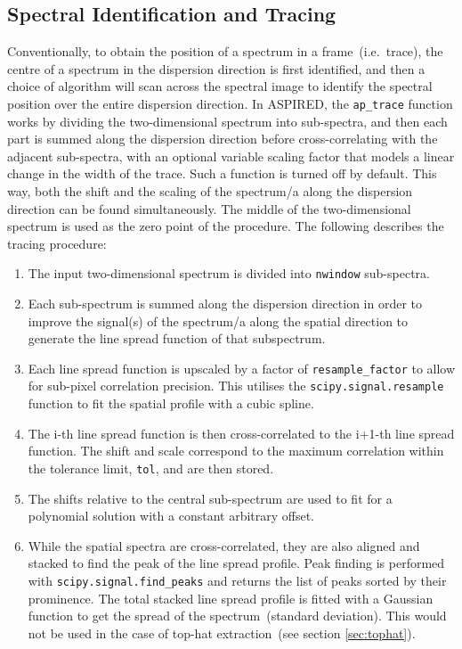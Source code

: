 \documentclass[linenumbers, twocolumn]{aastex631}
\begin{document}
\subsection{Spectral Identification and Tracing}
\label{sec:tracing}
Conventionally, to obtain the position of a spectrum in a frame~(i.e.\ trace),
the centre of a spectrum in the dispersion direction is first identified,
and then a choice of algorithm will scan across the spectral image to identify
the spectral position over the entire dispersion direction. In \textsc{ASPIRED},
the \texttt{ap\_trace} function works by dividing the two-dimensional spectrum
into sub-spectra, and then each part is summed along the dispersion direction
before cross-correlating with the adjacent sub-spectra, with an optional variable
scaling factor that models a linear change in the width of the trace. Such a
function is turned off by default. This way, both the shift and the scaling of
the spectrum/a along the dispersion direction can be found simultaneously. The
middle of the two-dimensional spectrum is used as the zero point of the
procedure. The following describes the tracing procedure:
\begin{enumerate}
    \item
        The input two-dimensional spectrum is divided into \texttt{nwindow}
        sub-spectra.
    \item
        Each sub-spectrum is summed along the dispersion direction
        in order to improve the signal(s) of the spectrum/a along
        the spatial direction to generate the line spread function
        of that subspectrum.
    \item
        Each line spread function is upscaled by a factor of
        \texttt{resample\_factor} to allow for sub-pixel correlation
        precision. This utilises the \texttt{scipy.signal.resample}
        function to fit the spatial profile with a cubic spline.
    \item
        The i-th line spread function is then cross-correlated to the i+1-th
        line spread function. The shift and scale correspond to the maximum
        correlation within the tolerance limit, \texttt{tol}, and are then stored.
    \item
        The shifts relative to the central sub-spectrum are used to
        fit for a polynomial solution with a constant arbitrary offset.
    \item
        While the spatial spectra are cross-correlated, they are also
        aligned and stacked to find the peak of the line spread profile.
        Peak finding is performed with \texttt{scipy.signal.find\_peaks}
        and returns the list of peaks sorted by their prominence. The
        total stacked line spread profile is fitted with a Gaussian
        function to get the spread of the spectrum~(standard deviation).
        This would not be used in the case of top-hat
        extraction~(see section \textsection\ref{sec:tophat}).
\end{enumerate}
\end{document}
